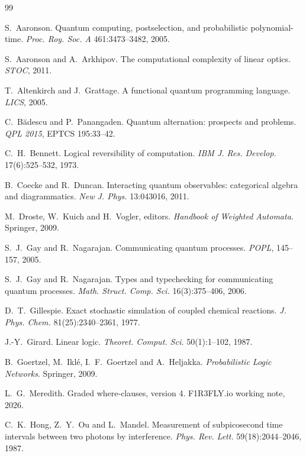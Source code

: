 \documentclass[11pt,a4paper]{article}
\theoremstyle{plain}
\theoremstyle{definition}
\theoremstyle{remark}
\begin{document}
\begin{thebibliography}{99}\small

 S.~Aaronson.
Quantum computing, postselection, and probabilistic polynomial-time.
\emph{Proc. Roy. Soc. A} 461:3473--3482, 2005.

 S.~Aaronson and A.~Arkhipov.
The computational complexity of linear optics. \emph{STOC}, 2011.

 T.~Altenkirch and J.~Grattage.
A functional quantum programming language. \emph{LICS}, 2005.

 C.~B\u{a}descu and P.~Panangaden.
Quantum alternation: prospects and problems.
\emph{QPL 2015}, EPTCS 195:33--42.

 C.~H.~Bennett.
Logical reversibility of computation.
\emph{IBM J. Res. Develop.} 17(6):525--532, 1973.

 B.~Coecke and R.~Duncan.
Interacting quantum observables: categorical algebra and diagrammatics.
\emph{New J. Phys.} 13:043016, 2011.

 M.~Droste, W.~Kuich and H.~Vogler, editors.
\emph{Handbook of Weighted Automata}. Springer, 2009.

 S.~J.~Gay and R.~Nagarajan.
Communicating quantum processes. \emph{POPL}, 145--157, 2005.

 S.~J.~Gay and R.~Nagarajan.
Types and typechecking for communicating quantum processes.
\emph{Math. Struct. Comp. Sci.} 16(3):375--406, 2006.

 D.~T.~Gillespie.
Exact stochastic simulation of coupled chemical reactions.
\emph{J. Phys. Chem.} 81(25):2340--2361, 1977.

 J.-Y.~Girard.
Linear logic. \emph{Theoret. Comput. Sci.} 50(1):1--102, 1987.

 B.~Goertzel, M.~Ikl\'e, I.~F.~Goertzel and A.~Heljakka.
\emph{Probabilistic Logic Networks}. Springer, 2009.

 L.~G.~Meredith.
Graded where-clauses, version 4. F1R3FLY.io working note, 2026.

 C.~K.~Hong, Z.~Y.~Ou and L.~Mandel.
Measurement of subpicosecond time intervals between two photons by
interference. \emph{Phys. Rev. Lett.} 59(18):2044--2046, 1987.


\end{thebibliography}
\end{document}
